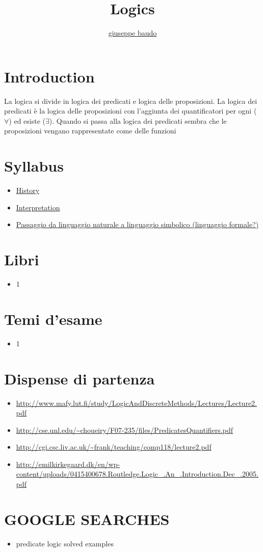 \documentclass[a4paper,10pt]{article}
\title{Logics}
\author{\href{http://www.baudo.hol.es}{giuseppe baudo}}
\begin{document}
\maketitle

\section{Introduction}
La logica si divide in logica dei predicati e logica delle proposizioni. La logica dei predicati è la logica delle proposizioni con l'aggiunta dei quantificatori
per ogni ($\forall$) ed esiste ($\exists$). Quando si passa alla logica dei predicati sembra che le proposizioni vengano rappresentate come delle funzioni

\section{Syllabus}
\begin{itemize}
 \item \href{../history/history.html}{History}
 \item \href{./Interpretation.html}{Interpretation}
 \item \href{./Passaggio.html}{Passaggio da linguaggio naturale a linguaggio simbolico (linguaggio formale?)}
\end{itemize}

\section{Libri}
  \begin{itemize}
   \item 1
  \end{itemize}

\section{Temi d'esame}
  \begin{itemize}
   \item 1
  \end{itemize}

\section{Dispense di partenza}
\begin{itemize}
  \item \url{http://www.mafy.lut.fi/study/LogicAndDiscreteMethods/Lectures/Lecture2.pdf}
  \item \url{http://cse.unl.edu/~choueiry/F07-235/files/PredicatesQuantifiers.pdf}
  \item \url{http://cgi.csc.liv.ac.uk/~frank/teaching/comp118/lecture2.pdf}
  \item \url{http://emilkirkegaard.dk/en/wp-content/uploads/0415400678.Routledge.Logic_.An_.Introduction.Dec_.2005.pdf}
\end{itemize}

\section{GOOGLE SEARCHES}
\begin{itemize}
 \item predicate logic solved examples
\end{itemize}
\end{document}
